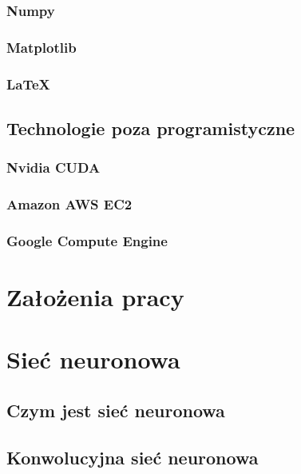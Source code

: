 \documentclass[a4paper,oneside]{report}
\begin{document}
\subsection {Numpy}

\subsection {Matplotlib}

\subsection {LaTeX}

\section {Technologie poza programistyczne}

\subsection{Nvidia CUDA}

\subsection {Amazon AWS EC2}

\subsection {Google Compute Engine}


\chapter {Założenia pracy}


\chapter {Sieć neuronowa}

\section {Czym jest sieć neuronowa}

\section {Konwolucyjna sieć neuronowa}
\end{document}
